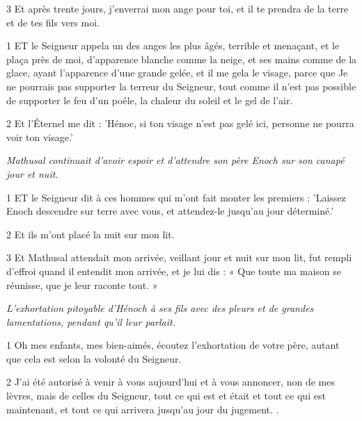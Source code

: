 \par 3 Et après trente jours, j'enverrai mon ange pour toi, et il te prendra de la terre et de tes fils vers moi.


\par 1 ET le Seigneur appela un des anges les plus âgés, terrible et menaçant, et le plaça près de moi, d'apparence blanche comme la neige, et ses mains comme de la glace, ayant l'apparence d'une grande gelée, et il me gela le visage, parce que Je ne pourrais pas supporter la terreur du Seigneur, tout comme il n'est pas possible de supporter le feu d'un poêle, la chaleur du soleil et le gel de l'air.

\par 2 Et l'Éternel me dit : 'Hénoc, si ton visage n'est pas gelé ici, personne ne pourra voir ton visage.'


\par \textit{Mathusal continuait d'avoir espoir et d'attendre son père Enoch sur son canapé jour et nuit.}

\par 1 ET le Seigneur dit à ces hommes qui m'ont fait monter les premiers : 'Laissez Enoch descendre sur terre avec vous, et attendez-le jusqu'au jour déterminé.'

\par 2 Et ils m'ont placé la nuit sur mon lit.

\par 3 Et Mathusal attendait mon arrivée, veillant jour et nuit sur mon lit, fut rempli d'effroi quand il entendit mon arrivée, et je lui dis : « Que toute ma maison se réunisse, que je leur raconte tout. »


\par \textit{L'exhortation pitoyable d'Hénoch à ses fils avec des pleurs et de grandes lamentations, pendant qu'il leur parlait.}

\par 1 Oh mes enfants, mes bien-aimés, écoutez l'exhortation de votre père, autant que cela est selon la volonté du Seigneur.

\par 2 J'ai été autorisé à venir à vous aujourd'hui et à vous annoncer, non de mes lèvres, mais de celles du Seigneur, tout ce qui est et était et tout ce qui est maintenant, et tout ce qui arrivera jusqu'au jour du jugement. .

